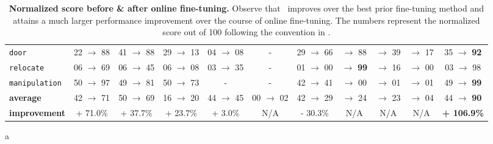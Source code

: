 \begin{table}[h]
{\begin{center}
{\begin{tabular}{l|c|c|c|c|c|c|c|c|c||c}
\texttt{door} & 22 $\rightarrow$ 88 & 41 $\rightarrow$ 88 & 29 $\rightarrow$ 13 & 04 $\rightarrow$ 08 & - & 29 $\rightarrow$ 66 &  $\rightarrow$ 88 &  $\rightarrow$ 39 &  $\rightarrow$ 17 & 35 $\rightarrow$ \textbf{92} \\
\texttt{relocate} & 06 $\rightarrow$ 69 & 06 $\rightarrow$ 45 & 06 $\rightarrow$ 08 & 03 $\rightarrow$ 35 & - & 01 $\rightarrow$ 00 &  $\rightarrow$ \textbf{99} &  $\rightarrow$ 16 &  $\rightarrow$ 00 & 03 $\rightarrow$ 98 \\  \hline
\texttt{manipulation} & 50 $\rightarrow$ 97 & 49 $\rightarrow$ 81 & 50 $\rightarrow$ 73 & - & - & 42 $\rightarrow$ 41 &  $\rightarrow$ 00 &  $\rightarrow$ 01 &  $\rightarrow$ 01 & 49 $\rightarrow$ \textbf{99} \\ \hline \hline
\textbf{average} & 42 $\rightarrow$ 71 & 50 $\rightarrow$ 69 & 16 $\rightarrow$ 20 & 44 $\rightarrow$ 45 & 00 $\rightarrow$ 02 & 42 $\rightarrow$ 29 &  $\rightarrow$ 24 &  $\rightarrow$ 23 &  $\rightarrow$ 04 & 44 $\rightarrow$ \textbf{90} \\ \hline
\textbf{improvement} & + 71.0\%  & + 37.7\%  & + 23.7\%  & + 3.0\%  & N/A  & - 30.3\%  & N/A &  N/A &  N/A & \textbf{+ 106.9\%}  \\
\end{tabular}}
\vspace{-0.15cm}
a\caption{\footnotesize{\textbf{Normalized score before \& after online fine-tuning.} Observe that \methodname\ improves over the best prior fine-tuning method and attains a much larger performance improvement over the course of online fine-tuning. The numbers represent the normalized score out of 100 following the convention in \citep{fu2020d4rl}.} \label{tab:performance}}

\vspace{-0.3cm}
\end{center}
}
\end{table}

